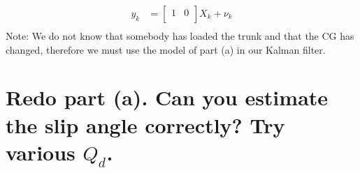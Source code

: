 \documentclass[12pt,letterpaper, onecolumn]{exam}
\begin{document}
\begin{questions}
\begin{parts}
{\begin{equation*}
\begin{split}
                    y_k & =
                    \begin{bmatrix}
                        1 & 0 \\
                    \end{bmatrix}
                    X_k + \nu_k\\
                \end{split}
            \end{equation*}
            Note: We do not know that somebody has loaded the trunk and that the CG has changed, therefore we must use the model of part (a) in our Kalman filter.
        }

        \part{Redo part (a). Can you estimate the slip angle correctly? Try various $Q_d$.}



\end{parts}
\end{questions}
\end{document}
